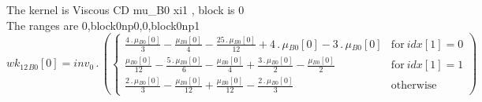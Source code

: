 \documentclass{article}
\begin{document}
\noindent The kernel is Viscous CD mu_B0 xi1 , block is 0\\\noindent The ranges are 0,block0np0,0,block0np1\\\begin{dmath}{wk_{12}{_{B0}}}[{0}] = inv_0 \,.\, \left(\begin{cases} \frac{4 \,.\, {\mu{_{B0}}}[{0}]}{3} - \frac{{\mu{_{B0}}}[{0}]}{4} - \frac{25 \,.\, {\mu{_{B0}}}[{0}]}{12} + 4 \,.\, {\mu{_{B0}}}[{0}] - 3 \,.\, {\mu{_{B0}}}[{0}] & \text{for}\: 
{idx}[{1}] = 0 \\\frac{{\mu{_{B0}}}[{0}]}{12} - \frac{5 \,.\, {\mu{_{B0}}}[{0}]}{6} - \frac{{\mu{_{B0}}}[{0}]}{4} + \frac{3 \,.\, {\mu{_{B0}}}[{0}]}{2} - \frac{{\mu{_{B0}}}[{0}]}{2} & \text{for}\: {idx}[{1}] = 1 \\\frac{2 \,.\, {\mu{_{B0}}}[{0}]}{3} 
- \frac{{\mu{_{B0}}}[{0}]}{12} + \frac{{\mu{_{B0}}}[{0}]}{12} - \frac{2 \,.\, {\mu{_{B0}}}[{0}]}{3} & \text{otherwise} \end{cases}\right)\end{dmath}
\end{document}
